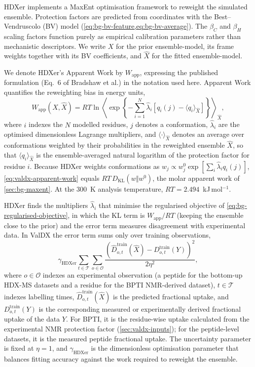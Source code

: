 HDXer implements a MaxEnt optimisation framework to reweight the simulated ensemble.\supercite{bradshawInterpretationHDXData2020} Protection factors are predicted from coordinates with the Best--Vendruscolo (BV) model (\cref{eq:bg-bv-feature,eq:bg-bv-average}). The $\beta_C$ and $\beta_H$ scaling factors function purely as empirical calibration parameters rather than mechanistic descriptors. We write $X$ for the prior ensemble-model, its frame weights together with its BV coefficients, and $\hat X$ for the fitted ensemble-model.

We denote HDXer's Apparent Work by $W_\text{app}$, expressing the published formulation (Eq.~6 of Bradshaw et al.\supercite{bradshawInterpretationHDXData2020}) in the notation used here. Apparent Work quantifies the reweighting bias in energy units,
\begin{equation}
    W_\text{app}(X,\hat X) = RT\ln
    \left\langle \exp\left\{
    -\sum_{i=1}^{N}\hat\lambda_i
    \left[q_i(j)-\langle q_i\rangle_{\hat X}\right]
    \right\}\right\rangle_{\hat X},
    \label{eq:valdx-apparent-work}
\end{equation}
where $i$ indexes the $N$ modelled residues, $j$ denotes a conformation, $\hat\lambda_i$ are the optimised dimensionless Lagrange multipliers, and $\langle\cdot\rangle_{\hat X}$ denotes an average over conformations weighted by their probabilities in the reweighted ensemble $\hat X$, so that $\langle q_i\rangle_{\hat X}$ is the ensemble-averaged natural logarithm of the protection factor for residue $i$. Because HDXer weights conformations as $w_j\propto w_j^0\exp[\sum_i\hat\lambda_i q_i(j)]$, \cref{eq:valdx-apparent-work} equals $RT\,D_\text{KL}(w\Vert w^0)$, the molar apparent work of \cref{sec:bg-maxent}. At the 300~K analysis temperature, $RT=2.494$~kJ\,mol$^{-1}$.

HDXer finds the multipliers $\hat\lambda_i$ that minimise the regularised objective of \cref{eq:bg-regularised-objective}, in which the KL term is $W_\text{app}/RT$ (keeping the ensemble close to the prior) and the error term measures disagreement with experimental data. In ValDX the error term sums only over training observations,
\begin{equation}
    \gamma_\text{HDXer}\sum_{t\in\mathcal T}\sum_{o\in\mathcal O}
    \frac{\left(\hat D_{o,t}^\text{train}(\hat X)-D_{o,t}^\text{train}(Y)\right)^2}{2\eta^2},
    \label{eq:valdx-hdxer-error}
\end{equation}
where $o\in\mathcal O$ indexes an experimental observation (a peptide for the bottom-up HDX-MS datasets and a residue for the BPTI NMR-derived dataset), $t\in\mathcal T$ indexes labelling times, $\hat D_{o,t}^\text{train}(\hat X)$ is the predicted fractional uptake, and $D_{o,t}^\text{train}(Y)$ is the corresponding measured or experimentally derived fractional uptake of the data $Y$. For BPTI, it is the residue-wise uptake calculated from the experimental NMR protection factor (\cref{sec:valdx-inputs}); for the peptide-level datasets, it is the measured peptide fractional uptake. The uncertainty parameter is fixed at $\eta=1$, and $\gamma_\text{HDXer}$ is the dimensionless optimisation parameter that balances fitting accuracy against the work required to reweight the ensemble.

